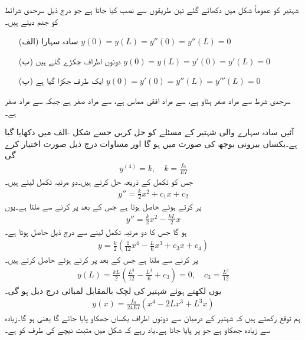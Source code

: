 شہتیر کو عموماً شکل  میں دکھائے گئے تین طریقوں سے  نصب کیا جاتا ہے جو درج ذیل سرحدی شرائط کو جنم دیتے ہیں۔
\begin{itemize}
\item[(الف)]\quad سادہ سہارا \quad
$y(0)=y(L)=y''(0)=y''(L)=0$
\item[(ب)]\quad دونوں اطراف جکڑے گئے ہیں \quad 
$y(0)=y(L)=y'(0)=y'(L)=0$
\item[(پ)]\quad ایک طرف جکڑا گیا ہے \quad
$y(0)=y'(0)=y''(L)=y'''(L)=0$
\end{itemize}
سرحدی  شرط  سے مراد صفر ہٹاو ہے،  سے مراد افقی مماس ہے،  سے مراد صفر   ہے جبکہ  سے مراد صفر  ہے۔

آئیں سادہ سہارے والی شہتیر کے مسئلے کو حل کریں جسے شکل -الف میں دکھایا گیا ہے۔یکساں بیرونی بوجھ کی صورت میں  ہو گا اور مساوات  درج ذیل صورت اختیار کرے گی
\begin{align}
y^{(4)}=k, \quad k=\frac{f_0}{EI}
\end{align}
جس کو تکمل کے ذریعہ حل کرتے ہیں۔دو مرتبہ تکمل لیتے ہیں۔
\begin{align*}
y''=\frac{k}{2}x^2+c_1x+c_2
\end{align*}
 پر کرتے ہوئے  حاصل ہوتا ہے جس کے بعد   پر کرنے سے  ملتا ہے۔یوں
\begin{align*}
y''=\frac{k}{2}x^2-\frac{kL}{2}x
\end{align*}
ہو گا جس کا دو مرتبہ تکمل لینے سے درج ذیل حاصل ہوتا ہے۔
\begin{align*}
y=\frac{k}{2}\left(\frac{1}{12}x^4-\frac{L}{6}x^3+c_3x+c_4\right)
\end{align*}
 پر کرنے سے  ملتا ہے جس کے بعد  پر کرتے ہوئے  حاصل کرتے ہیں۔
\begin{align*}
y(L)=\frac{kL}{2}\left(\frac{L^3}{12}-\frac{L^3}{6}+c_3\right)=0, \quad c_3=\frac{L^3}{12}
\end{align*}
یوں  لکھتے ہوئے شہتیر کی لچک بالمقابل لمبائی درج ذیل ہو گی۔
\begin{align*}
y(x)=\frac{f_0}{24EI}(x^4-2Lx^3+L^3x)
\end{align*}
ہم توقع رکھتے ہیں کہ شہتیر کے درمیان سے دونوں اطراف یکساں جھکاو پایا جائے گا یعنی  ہو گا۔زیادہ سے زیادہ جھکاو  ہے جو  پر پایا جاتا ہے۔یاد رہے کہ شکل  میں مثبت  نیچے کی طرف کو ہے۔

